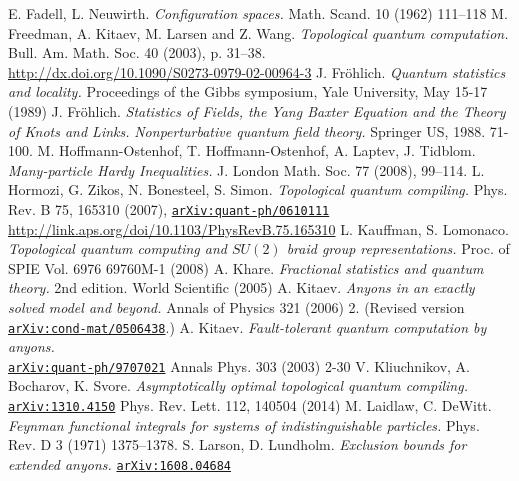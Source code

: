 \begin{thebibliography}{99}
 E. Fadell, L. Neuwirth. \textit{Configuration spaces.} Math. Scand. 10 (1962) 111–118
 M. Freedman, A. Kitaev, M. Larsen and Z. Wang. \textit{Topological quantum computation.} Bull. Am. Math. Soc. 40 (2003), p. 31–38. \\ \url{http://dx.doi.org/10.1090/S0273-0979-02-00964-3}
 J. Fröhlich. \textit{Quantum statistics and locality.} Proceedings of the Gibbs symposium, Yale University, May 15-17 (1989)
 J. Fröhlich. \textit{Statistics of Fields, the Yang Baxter Equation and the Theory of Knots and Links.} \textit{Nonperturbative quantum field theory.} Springer US, 1988. 71-100.
 M. Hoffmann-Ostenhof, T. Hoffmann-Ostenhof, A. Laptev, J. Tidblom. \textit{Many-particle Hardy Inequalities.} J. London Math. Soc. 77 (2008), 99–114.
 L. Hormozi, G. Zikos, N. Bonesteel, S. Simon. \textit{Topological quantum compiling.} Phys. Rev. B 75, 165310 (2007), \href{https://arxiv.org/abs/quant-ph/0610111}{\texttt{arXiv:quant-ph/0610111}} \\ \url{http://link.aps.org/doi/10.1103/PhysRevB.75.165310}
 L. Kauffman, S. Lomonaco. \textit{Topological quantum computing and $SU(2)$ braid group representations.} Proc. of SPIE Vol. 6976  69760M-1 (2008)
 A. Khare. \textit{Fractional statistics and quantum theory.} 2nd edition. World Scientific (2005)
 A. Kitaev. \textit{Anyons in an exactly solved model and beyond.} Annals of Physics 321 (2006) 2. (Revised version \href{https://arxiv.org/abs/cond-mat/0506438}{\texttt{arXiv:cond-mat/0506438}}.)%
 A. Kitaev. \textit{Fault-tolerant quantum computation by anyons.} \\ \href{https://arxiv.org/abs/quant-ph/9707021}{\texttt{arXiv:quant-ph/9707021}} Annals Phys. 303 (2003) 2-30
 V. Kliuchnikov, A. Bocharov, K. Svore. \textit{Asymptotically optimal topological quantum compiling.} \href{https://arxiv.org/abs/1310.4150}{\texttt{arXiv:1310.4150}} Phys. Rev. Lett. 112, 140504 (2014)
 M. Laidlaw, C. DeWitt. \textit{Feynman functional integrals for systems of indistinguishable particles.} Phys. Rev. D 3 (1971) 1375–1378.
 S. Larson, D. Lundholm. \textit{Exclusion bounds for extended anyons.} \href{https://arxiv.org/abs/1608.04684}{\texttt{arXiv:1608.04684}}

\end{thebibliography}
